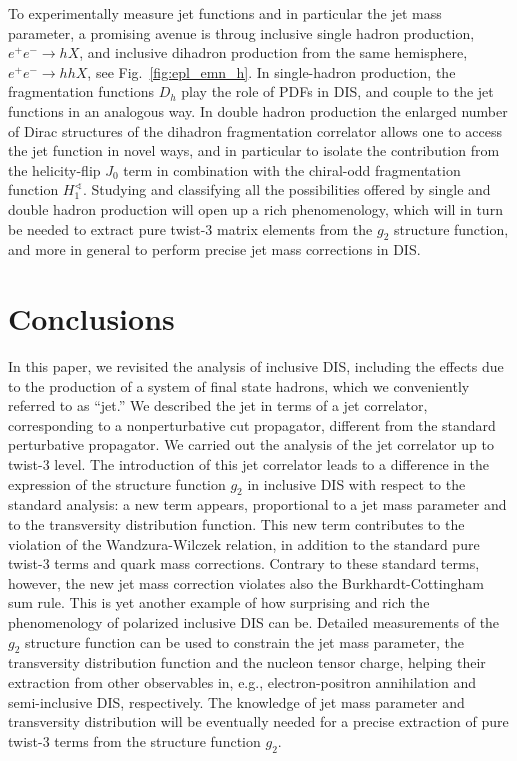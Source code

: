 \documentclass[preprintnumbers,floatfix,nofootinbib]{revtex4}
\begin{document}
To experimentally measure jet functions and in particular the jet mass parameter, a promising avenue is throug inclusive single hadron production, $e^+ e^- \to h X$, and inclusive dihadron 
production from the same hemisphere, $e^+ e^- \to h h X$, see 
Fig.~\ref{fig:epl_emn_h}.
In single-hadron production, the fragmentation functions $D_h$
play the role of PDFs in DIS, and couple to the jet functions
in an analogous way. 
In double hadron production the enlarged number of Dirac structures
of the dihadron fragmentation correlator allows one to access
the jet function in novel ways, and in particular to isolate the
contribution from the helicity-flip $J_0$ term in combination with the
chiral-odd fragmentation function $H_1^{\sphericalangle}$.
Studying and classifying all the possibilities offered by single and
double hadron production will open up a rich phenomenology, which will in turn
be needed to extract pure twist-3 matrix elements from the $g_2$ structure function, and more in general to perform precise jet mass corrections in DIS.


\section{Conclusions}

In this paper, we revisited the analysis of inclusive DIS, including the
effects due to the production of a system of final state hadrons, which we
conveniently referred to as ``jet.'' We described the jet in terms of a jet
correlator, corresponding to a 
nonperturbative cut propagator, different from the standard
perturbative propagator. We
carried out the
analysis of the jet correlator up to twist-3 level. The introduction of this jet correlator
leads to a difference in the expression of the structure function $g_2$ in
inclusive DIS with respect to the standard analysis: a new term appears, proportional to a jet mass
parameter and to the transversity distribution function. This new term
contributes to the violation of the Wandzura-Wilczek relation, in addition to
the standard pure twist-3 terms and quark mass corrections. Contrary to these
standard terms, however, the new jet mass correction violates also the
Burkhardt-Cottingham sum rule. This is yet another example of how surprising
and rich the phenomenology of polarized inclusive DIS can be. Detailed measurements of the $g_2$ structure
function can be used to constrain the jet mass parameter, the transversity
distribution function and the nucleon tensor charge, helping their extraction from other observables in, e.g.,
electron-positron annihilation and semi-inclusive DIS, respectively. The
knowledge of jet
mass parameter and transversity distribution will be eventually needed for a precise
extraction of pure twist-3 terms from the structure function $g_2$.
\end{document}
